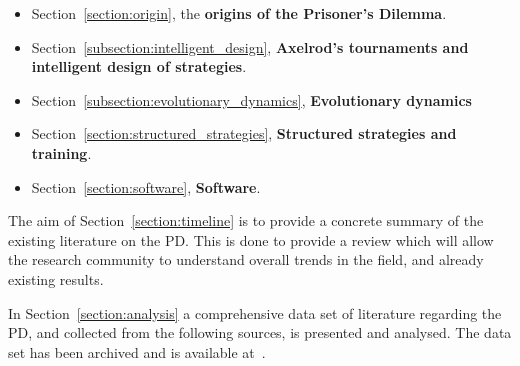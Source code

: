 \documentclass{article}
\theoremstyle{definition}
\begin{document}
\begin{itemize}
    \item Section~\ref{section:origin}, the \textbf{origins of the Prisoner's
    Dilemma}.
    \item Section~\ref{subsection:intelligent_design}, \textbf{Axelrod's
    tournaments and intelligent design of strategies}.
    \item Section~\ref{subsection:evolutionary_dynamics}, \textbf{Evolutionary dynamics}
    \item Section~\ref{section:structured_strategies}, \textbf{Structured
    strategies and training}.
    \item Section~\ref{section:software}, \textbf{Software}.
\end{itemize}

The aim of Section~\ref{section:timeline} is to provide a concrete summary of
the existing literature on the PD. This is done to provide a review which will
allow the research community to understand overall trends in the field, and
already existing results.

In Section~\ref{section:analysis} a comprehensive data set of literature
regarding the PD, and collected from the following sources, is presented and
analysed. The data set has been archived and is available at~\cite{pd_data_2018}.
\end{document}
